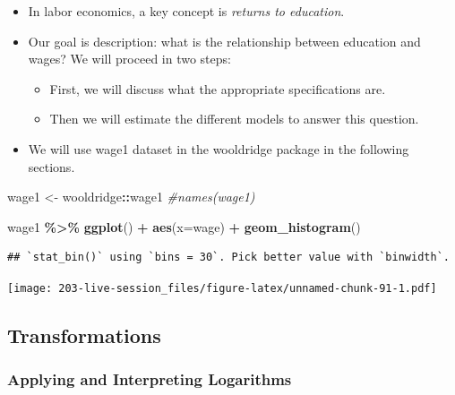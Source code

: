 \documentclass[
]{book}
\newenvironment{Shaded}{\begin{snugshade}}{\end{snugshade}}
\newcommand{\AttributeTok}[1]{\textcolor[rgb]{0.13,0.29,0.53}{#1}}
\newcommand{\CommentTok}[1]{\textcolor[rgb]{0.56,0.35,0.01}{\textit{#1}}}
\newcommand{\FunctionTok}[1]{\textcolor[rgb]{0.13,0.29,0.53}{\textbf{#1}}}
\newcommand{\NormalTok}[1]{#1}
\newcommand{\OtherTok}[1]{\textcolor[rgb]{0.56,0.35,0.01}{#1}}
\newcommand{\SpecialCharTok}[1]{\textcolor[rgb]{0.81,0.36,0.00}{\textbf{#1}}}
\providecommand{\tightlist}{%
  \setlength{\itemsep}{0pt}\setlength{\parskip}{0pt}}
\theoremstyle{definition}
\theoremstyle{definition}
\theoremstyle{definition}
\theoremstyle{definition}
\theoremstyle{remark}
\begin{document}
\begin{itemize}
\tightlist
\item
  In labor economics, a key concept is \emph{returns to education}.\\
\item
  Our goal is description: what is the relationship between education and wages? We will proceed in two steps:

  \begin{itemize}
  \tightlist
  \item
    First, we will discuss what the appropriate specifications are.
  \item
    Then we will estimate the different models to answer this question.
  \end{itemize}
\item
  We will use wage1 dataset in the wooldridge package in the following sections.
\end{itemize}

\begin{Shaded}
\begin{Highlighting}[]
\NormalTok{wage1 }\OtherTok{\textless{}{-}}\NormalTok{ wooldridge}\SpecialCharTok{::}\NormalTok{wage1}
\CommentTok{\#names(wage1)}

\NormalTok{wage1 }\SpecialCharTok{\%\textgreater{}\%} 
  \FunctionTok{ggplot}\NormalTok{() }\SpecialCharTok{+} 
  \FunctionTok{aes}\NormalTok{(}\AttributeTok{x=}\NormalTok{wage) }\SpecialCharTok{+} 
  \FunctionTok{geom\_histogram}\NormalTok{()}
\end{Highlighting}
\end{Shaded}

\begin{verbatim}
## `stat_bin()` using `bins = 30`. Pick better value with `binwidth`.
\end{verbatim}

\texttt{[image: 203-live-session\_files/figure-latex/unnamed-chunk-91-1.pdf]}

\hypertarget{transformations}{%
\subsection{Transformations}\label{transformations}}

\hypertarget{applying-and-interpreting-logarithms}{%
\subsubsection{Applying and Interpreting Logarithms}\label{applying-and-interpreting-logarithms}}
\end{document}
